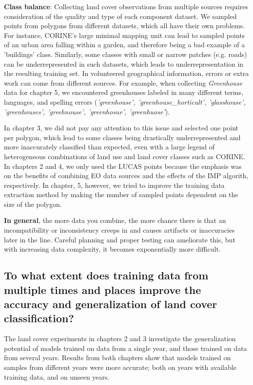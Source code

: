             \textbf{Class balance}: Collecting land cover observations from multiple sources requires consideration of the quality and type of each component dataset. We sampled points from polygons from different datasets, which all have their own problems. For instance, CORINE's large minimal mapping unit can lead to sampled points of an urban area falling within a garden, and therefore being a bad example of a 'buildings' class. Similarly, some classes with small or narrow patches (e.g. roads) can be underrepresented in such datasets, which leads to underrepresentation in the resulting training set. In volunteered geographical information, errors or extra work can come from different sources. For example, when collecting \textit{Greenhouse} data for chapter 5, we encountered greenhouses labeled in many different terms, languages, and spelling errors (\textit{'greenhouse', 'greenhouse\_horticult', 'glasshouse', 'greenhouses', 'greehnouse', 'greenhosue', 'greenhuose'}).

            In chapter 3, we did not pay any attention to this issue and selected one point per polygon, which lead to some classes being drastically underrepresented and more inaccurately classified than expected, even with a large legend of heterogeneous combinations of land use and land cover classes such as CORINE. In chapters 2 and 4, we only used the LUCAS points because the emphasis was on the benefits of combining EO data sources and the effects of the IMP algorith, respectively. In chapter, 5, however, we tried to improve the training data extraction method by making the number of sampled points dependent on the size of the polygon.

            \textbf{In general}, the more data you combine, the more chance there is that an incompatibility or inconsistency creeps in and causes artifacts or inaccuracies later in the line. Careful planning and proper testing can ameliorate this, but with increasing data complexity, it becomes exponentially more difficult.
            

    \subsection{To what extent does training data from multiple times and places improve the accuracy and generalization of land cover classification?}
    \label{syn:rq2}
    
        The land cover experiments in chapters 2 and 3 investigate the generalization potential of models trained on data from a single year, and those trained on data from several years. Results from both chapters show that models trained on samples from different years were more accurate; both on years with available training data, and on unseen years.
        
